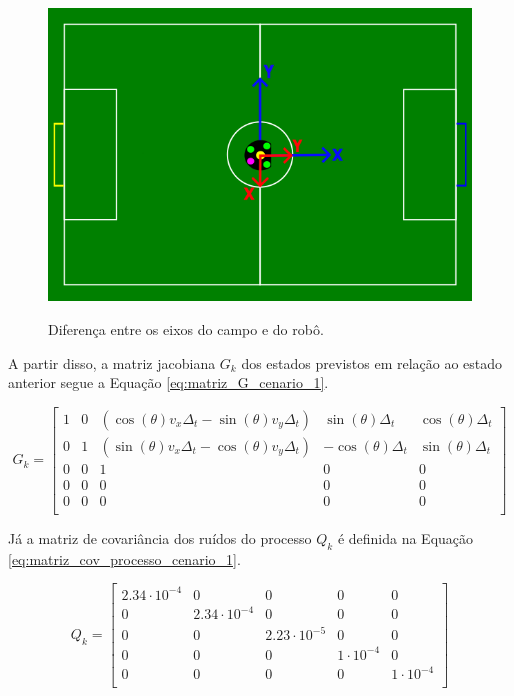 \documentclass[acronym, symbols, table]{fei}
\begin{document}
			\begin{figure}[!htb]
				\centering
				\caption{Diferença entre os eixos do campo e do robô.}
				\includegraphics[width=1.0\textwidth]{representacao_eixos_robo_campo.png}
				\label{fig:representacao_eixos_robo_campo}
			\end{figure}
		
			 A partir disso, a matriz jacobiana $G_k$ dos estados previstos em relação ao estado anterior segue a Equação \eqref{eq:matriz_G_cenario_1}.
		
			\begin{equation}\label{eq:matriz_G_cenario_1}
			 	G_{k} = \begin{bmatrix}
			 		1 & 0 & (\cos(\theta)v_x\Delta_t - \sin(\theta)v_y\Delta_t) & \sin(\theta)\Delta_t & \cos(\theta)\Delta_t \\
			 		0 & 1 & (\sin(\theta)v_x\Delta_t - \cos(\theta)v_y\Delta_t) & -\cos(\theta)\Delta_t & \sin(\theta)\Delta_t \\
			 		0 & 0 & 1 & 0 & 0 \\
			 		0 & 0 & 0 & 0 & 0 \\
			 		0 & 0 & 0 & 0 & 0 \\
			 	\end{bmatrix}
			 \end{equation}
		 
		 	Já a matriz de covariância dos ruídos do processo $Q_{k}$ é definida na Equação \eqref{eq:matriz_cov_processo_cenario_1}.
		 	
		 	\begin{equation}\label{eq:matriz_cov_processo_cenario_1}
		 		Q_{k} = \begin{bmatrix}
		 			2.34\cdot10^{-4} & 0 & 0 & 0 & 0 \\
		 			0 & 2.34\cdot10^{-4} & 0 & 0 & 0 \\
		 			0 & 0 & 2.23\cdot10^{-5} & 0 & 0 \\
		 			0 & 0 & 0 & 1\cdot10^{-4} & 0 \\
		 			0 & 0 & 0 & 0 & 1\cdot10^{-4} \\
		 		\end{bmatrix}
		 	\end{equation}
		 
\end{document}
